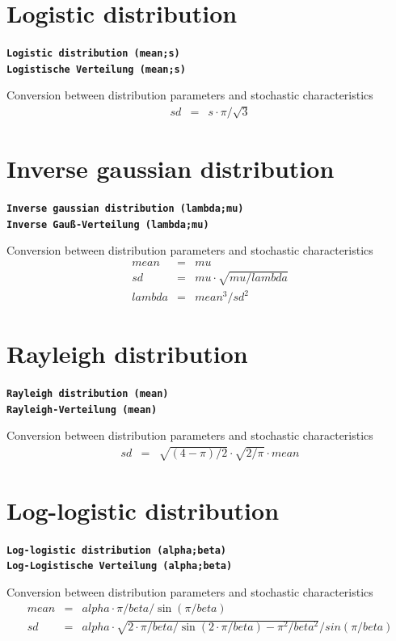 \documentclass{svmono}
\def\cm#1{\textbf{\texttt{#1}}}
\begin{document}
\section*{Logistic distribution}
\cm{Logistic distribution (mean;s)}~\\
\cm{Logistische Verteilung (mean;s)}

Conversion between distribution parameters and stochastic characteristics
\begin{eqnarray*}
sd&=&s\cdot\pi/\sqrt{3}
\end{eqnarray*}





\section*{Inverse gaussian distribution}
\cm{Inverse gaussian distribution (lambda;mu)}~\\
\cm{Inverse Gauß-Verteilung (lambda;mu)}

Conversion between distribution parameters and stochastic characteristics
\begin{eqnarray*}
mean&=&mu\\
sd&=&mu\cdot\sqrt{mu/lambda}\\
lambda&=&mean^3/sd^2
\end{eqnarray*}





\section*{Rayleigh distribution}
\cm{Rayleigh distribution (mean)}~\\
\cm{Rayleigh-Verteilung (mean)}

Conversion between distribution parameters and stochastic characteristics
\begin{eqnarray*}
sd&=&\sqrt{(4-\pi)/2}\cdot\sqrt{2/\pi}\cdot mean
\end{eqnarray*}





\section*{Log-logistic distribution}
\cm{Log-logistic distribution (alpha;beta)}~\\
\cm{Log-Logistische Verteilung (alpha;beta)}

Conversion between distribution parameters and stochastic characteristics
\begin{eqnarray*}
mean&=&alpha\cdot\pi/beta/\sin(\pi/beta)\\
sd&=&alpha\cdot\sqrt{2\cdot\pi/beta/\sin(2\cdot\pi/beta)-\pi^2/beta^2}/sin(\pi/beta)
\end{eqnarray*}
\end{document}
